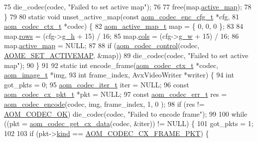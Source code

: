 \begin{DoxyCodeInclude}
{75     die\_codec(codec, \textcolor{stringliteral}{"Failed to set active map"});
76 
77   free(map.\hyperlink{structaom__active__map_a8916917bce716b1d954a9f476d98142e}{active\_map});
78 \}
79 
80 \textcolor{keyword}{static} \textcolor{keywordtype}{void} unset\_active\_map(\textcolor{keyword}{const} \hyperlink{structaom__codec__enc__cfg}{aom\_codec\_enc\_cfg\_t} *cfg,
81                              \hyperlink{structaom__codec__ctx}{aom\_codec\_ctx\_t} *codec) \{
82   \hyperlink{structaom__active__map}{aom\_active\_map\_t} map = \{ 0, 0, 0 \};
83 
84   map.\hyperlink{structaom__active__map_a0d7ce0e1050137bf9b88e8649ea7aec2}{rows} = (cfg->\hyperlink{structaom__codec__enc__cfg_a37b0f57b63bec8d133df8901d4407ee6}{g\_h} + 15) / 16;
85   map.\hyperlink{structaom__active__map_a3a105e0d8f2643cdc542e2f078b9e6b2}{cols} = (cfg->\hyperlink{structaom__codec__enc__cfg_a80cb459c5ef3c7e1516f617c4c9d6eab}{g\_w} + 15) / 16;
86   map.\hyperlink{structaom__active__map_a8916917bce716b1d954a9f476d98142e}{active\_map} = NULL;
87 
88   \textcolor{keywordflow}{if} (\hyperlink{group__codec_ga6da974f4eeaba1fa74106b28d0fe6ac5}{aom\_codec\_control}(codec, \hyperlink{group__aom__encoder_ggae78dde67a6d78f332e9bdba0dde42db5a709937e1e0eb160e49720e6fd5164d1e}{AOME\_SET\_ACTIVEMAP}, &map))
89     die\_codec(codec, \textcolor{stringliteral}{"Failed to set active map"});
90 \}
91 
92 \textcolor{keyword}{static} \textcolor{keywordtype}{int} encode\_frame(\hyperlink{structaom__codec__ctx}{aom\_codec\_ctx\_t} *codec, \hyperlink{structaom__image}{aom\_image\_t} *img,
93                         \textcolor{keywordtype}{int} frame\_index, AvxVideoWriter *writer) \{
94   \textcolor{keywordtype}{int} got\_pkts = 0;
95   \hyperlink{group__codec_gadf9e173c9e02788a9999399edab20a02}{aom\_codec\_iter\_t} iter = NULL;
96   \textcolor{keyword}{const} \hyperlink{structaom__codec__cx__pkt}{aom\_codec\_cx\_pkt\_t} *pkt = NULL;
97   \textcolor{keyword}{const} \hyperlink{group__codec_gaaae61e0f8663e6137f1e228757248e7c}{aom\_codec\_err\_t} res = \hyperlink{group__encoder_ga6f4a777de5389771e783df7ff1f116d4}{aom\_codec\_encode}(codec, img, frame\_index, 1, 0
      );
98   \textcolor{keywordflow}{if} (res != \hyperlink{group__codec_ggaaae61e0f8663e6137f1e228757248e7caf145dc2f86014a08ebad36ac2b140001}{AOM\_CODEC\_OK}) die\_codec(codec, \textcolor{stringliteral}{"Failed to encode frame"});
99 
100   \textcolor{keywordflow}{while} ((pkt = \hyperlink{group__encoder_gaedc4c56b60d4217677cb561066360884}{aom\_codec\_get\_cx\_data}(codec, &iter)) != NULL) \{
101     got\_pkts = 1;
102 
103     \textcolor{keywordflow}{if} (pkt->\hyperlink{structaom__codec__cx__pkt_a11e586120c689ece9a7690e72ff384be}{kind} == \hyperlink{group__encoder_ggafeb69da4a9649a54e805f59c26d8dfeda793165d0f219812342f69d5fd9b2b9c8}{AOM\_CODEC\_CX\_FRAME\_PKT}) \{
}
\end{DoxyCodeInclude}
